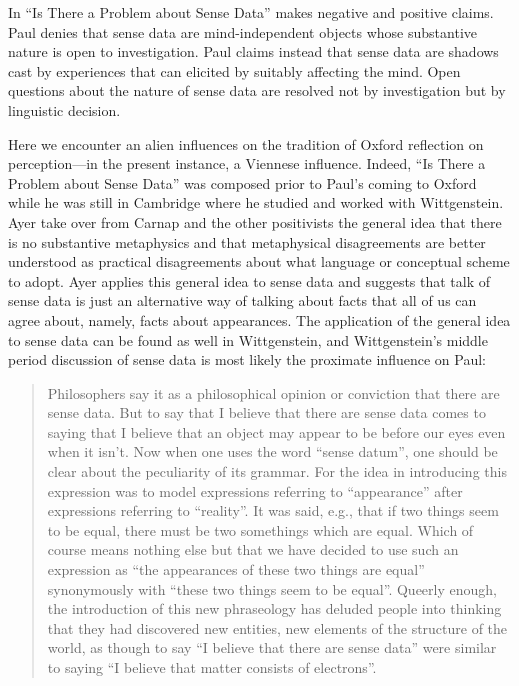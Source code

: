 In ``Is There a Problem about Sense Data'' \cite{Paul:1936kd} makes negative and positive claims. Paul denies that sense data are mind-independent objects whose substantive nature is open to investigation. Paul claims instead that sense data are shadows cast by experiences that can elicited by suitably affecting the mind. Open questions about the nature of sense data are resolved not by investigation but by linguistic decision.

Here we encounter an alien influences on the tradition of Oxford reflection on perception---in the present instance, a Viennese influence. Indeed, ``Is There a Problem about Sense Data'' was composed prior to Paul's coming to Oxford while he was still in Cambridge where he studied and worked with Wittgenstein. 
Ayer take over from Carnap and the other positivists the general idea that there is no substantive metaphysics and that metaphysical disagreements are better understood as practical disagreements about what language or conceptual scheme to adopt. Ayer applies this general idea to sense data and suggests that talk of sense data is just an alternative way of talking about facts that all of us can agree about, namely, facts about appearances. The application of the general idea to sense data can be found as well in Wittgenstein, and Wittgenstein's middle period discussion of sense data is most likely the proximate influence on Paul:
\begin{quote}
	Philosophers say it as a philosophical opinion or conviction that there are sense data. But to say that I believe that there are sense data comes to saying that I believe that an object may appear to be before our eyes even when it isn't. Now when one uses the word ``sense datum'', one should be clear about the peculiarity of its grammar. For the idea in introducing this expression was to model expressions referring to ``appearance'' after expressions referring to ``reality''. It was said, e.g., that if two things seem to be equal, there must be two somethings which are equal. Which of course means nothing else but that we have decided to use such an expression as ``the appearances of these two things are equal'' synonymously with ``these two things seem to be equal''. Queerly enough, the introduction of this new phraseology has deluded people into thinking that they had discovered new entities, new elements of the structure of the world, as though to say ``I believe that there are sense data'' were similar to saying ``I believe that matter consists of electrons''. \citep[70]{Wittgenstein:1958rr}
\end{quote}

